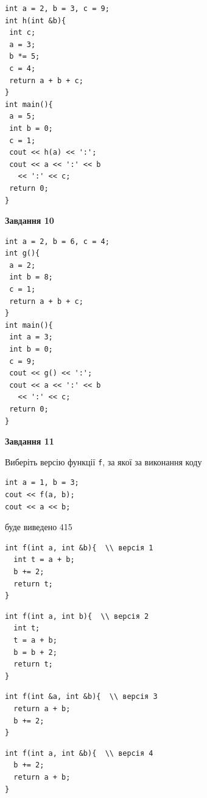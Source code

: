 \documentclass[12pt, ukrainian]{article}
\def\code#1{\Verb!#1!}
\begin{document}
{\begin {large}
\begin{minipage}[t]{7.0cm}
\begin{verbatim}
int a = 2, b = 3, c = 9;
int h(int &b){
 int c;
 a = 3;
 b *= 5;
 c = 4;
 return a + b + c;
}
int main(){
 a = 5;
 int b = 0;
 c = 1;
 cout << h(a) << ':';
 cout << a << ':' << b 
   << ':' << c;
 return 0;
}
\end{verbatim}



\begin{center}
\textbf{Завдання 10}
\end{center}
\vspace{-8mm}

\begin{verbatim}
int a = 2, b = 6, c = 4;
int g(){
 a = 2;
 int b = 8;
 c = 1;
 return a + b + c;
}
int main(){
 int a = 3;
 int b = 0;
 c = 9;
 cout << g() << ':';
 cout << a << ':' << b 
   << ':' << c;
 return 0;
}
\end{verbatim}

\end{minipage}
\vline \hspace{1mm}
\begin{minipage}[t]{11.0cm}

\begin{center}
\textbf{Завдання 11}
\end{center}
Виберіть версію функції \code{f}, за якої за виконання коду
\begin{verbatim}
int a = 1, b = 3;
cout << f(a, b);
cout << a << b;
\end{verbatim}

буде виведено 415

\begin{verbatim}
int f(int a, int &b){  \\ версія 1
  int t = a + b;
  b += 2;
  return t;
}
\end{verbatim}

\vspace{-8mm}\begin{verbatim}
int f(int a, int b){  \\ версія 2
  int t;
  t = a + b;
  b = b + 2;
  return t;
}
\end{verbatim}

\vspace{-8mm}\begin{verbatim}
int f(int &a, int &b){  \\ версія 3
  return a + b;
  b += 2;
}
\end{verbatim}

\vspace{-8mm}\begin{verbatim}
int f(int a, int &b){  \\ версія 4
  b += 2;
  return a + b;
}
\end{verbatim}




\end{minipage}
\end{large}}
\end{document}
